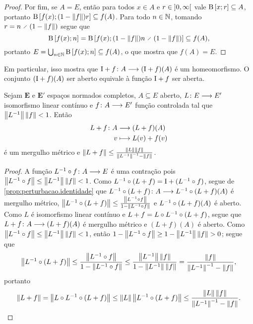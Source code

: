 \begin{proof}
Por fim, se $A=E$, então para todos $x \in A$ e $r \in \left]{0},{\infty}\right[$ vale $\mathrm{B}\left[{x};{r}\right] \subseteq A$, portanto $\mathrm{B}\left[{f(x)};{(1-\left\Vert{f}\right\Vert)r}\right] \subseteq f(A)$. Para todo $n \in \mathbb{N}$, tomando $r = n \div (1-\distor{f})$ segue que
	\begin{equation*}
	\bolafec{f(x)}{n} = \bolafec{f(x)}{(1-\distor{f})n \div (1-\distor{f})} \subseteq f(A),
	\end{equation*}
portanto $E = \bigcup_{n \in \mathbb{N}} \mathrm{B}\left[{f(x)};{n}\right] \subseteq f(A)$, o que mostra que $f(A)=E$.
\end{proof}

Em particular, isso mostra que ${\mathrm{I}+f}\colon {A} \longrightarrow {(\mathrm{I}+f)(A)}$ é um homeomorfismo. O conjunto $(\mathrm{I} + f)(A)$ ser aberto equivale à função $\mathrm{I} + f$ ser aberta.

\begin{proposition}
\label{prop:perturbacao.linear}
Sejam $\bm E$ e $\bm E'$ espaços normados completos, $A \subseteq E$ aberto, ${L}\colon {E} \longrightarrow {E'}$ isomorfismo linear contínuo e ${f}\colon {A} \longrightarrow {E'}$ função controlada tal que $\left\Vert{L^{-1}}\right\Vert\left\Vert{f}\right\Vert < 1$. Então
	\begin{align*}
	{L+f}\colon {A} &\longrightarrow {(L+f)(A)} \\{v} &\longmapsto L(v)+f(v)
	\end{align*}
é um mergulho métrico e $\left\Vert{L+f}\right\Vert \leq \frac{\left\Vert{L}\right\Vert\left\Vert{f}\right\Vert}{\left\Vert{L^{-1}}\right\Vert^{-1}-\left\Vert{f}\right\Vert}$.
\end{proposition}
\begin{proof}
A função ${L^{-1} \circ f}\colon {A} \longrightarrow {E}$ é uma contração pois $\left\Vert{L^{-1}\circ f}\right\Vert \leq \left\Vert{L^{-1}}\right\Vert\left\Vert{f}\right\Vert < 1$. Como $L^{-1} \circ (L+f) = \mathrm{I} + (L^{-1} \circ f)$, segue de \ref{prop:perturbacao.identidade} que ${L^{-1} \circ (L+f)}\colon {A} \longrightarrow {L^{-1}\circ (L+f)(A)}$ é mergulho métrico, $\left\Vert{L^{-1}\circ (L+f)}\right\Vert \leq \frac{\left\Vert{L^{-1}\circ f}\right\Vert}{1-\left\Vert{L^{-1}\circ f}\right\Vert}$ e $L^{-1} \circ (L+f)(A)$ é aberto. Como $L$ é isomorfismo linear contínuo e $L+f = L \circ L^{-1} \circ (L+f)$, segue que ${L+f}\colon {A} \longrightarrow {(L+f)(A)}$ é mergulho métrico e $(L+f)(A)$ é aberto. Como $\left\Vert{L^{-1}\circ f}\right\Vert \leq \left\Vert{L^{-1}}\right\Vert\left\Vert{f}\right\Vert < 1$, então $1-\left\Vert{L^{-1}\circ f}\right\Vert \geq 1-\left\Vert{L^{-1}}\right\Vert\left\Vert{f}\right\Vert > 0$; segue que
	\begin{equation*}
	\left\Vert{L^{-1}\circ (L+f)}\right\Vert \leq \frac{\left\Vert{L^{-1}\circ f}\right\Vert}{1-\left\Vert{L^{-1}\circ f}\right\Vert}
		\leq \frac{\left\Vert{L^{-1}}\right\Vert\left\Vert{f}\right\Vert}{1-\left\Vert{L^{-1}}\right\Vert\left\Vert{f}\right\Vert}
		= \frac{\left\Vert{f}\right\Vert}{\left\Vert{L^{-1}}\right\Vert^{-1}-\left\Vert{f}\right\Vert},
	\end{equation*}
portanto
	\begin{equation*}
	\left\Vert{L+f}\right\Vert = \left\Vert{L \circ L^{-1}\circ (L+f)}\right\Vert
		\leq \left\Vert{L}\right\Vert\left\Vert{L^{-1}\circ (L+f)}\right\Vert
		\leq \frac{\left\Vert{L}\right\Vert\left\Vert{f}\right\Vert}{\left\Vert{L^{-1}}\right\Vert^{-1}-\left\Vert{f}\right\Vert}.
		\qedhere
	\end{equation*}
\end{proof}



